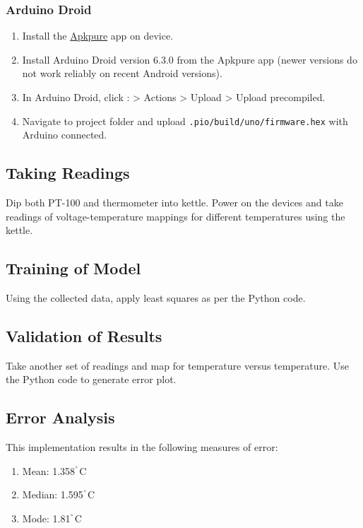 \documentclass{article}
\begin{document}
\subsubsection{Arduino Droid}
\begin{enumerate}
    \item Install the \href{https://apkpure.com}{Apkpure} app on device.
    \item Install Arduino Droid version 6.3.0 from the Apkpure app (newer versions do not work reliably on recent Android versions).
    \item In Arduino Droid, click : \textgreater{} Actions \textgreater{} Upload \textgreater{} Upload precompiled.
    \item Navigate to project folder and upload \texttt{.pio/build/uno/firmware.hex} with Arduino connected.
\end{enumerate}

\subsection{Taking Readings}
Dip both PT-100 and thermometer into kettle. Power on the devices and take readings of voltage-temperature mappings for different temperatures using the kettle.

\subsection{Training of Model}
Using the collected data, apply least squares as per the Python code.

\subsection{Validation of Results}
Take another set of readings and map for temperature versus temperature. Use the Python code to generate error plot.

\subsection{Error Analysis}
This implementation results in the following measures of error:
\begin{enumerate}
    \item Mean: 1.358$^{\degree}$C
    \item Median: 1.595$^{\degree}$C
    \item Mode: 1.81$^{\degree}$C
\end{enumerate}
    
\end{document}
